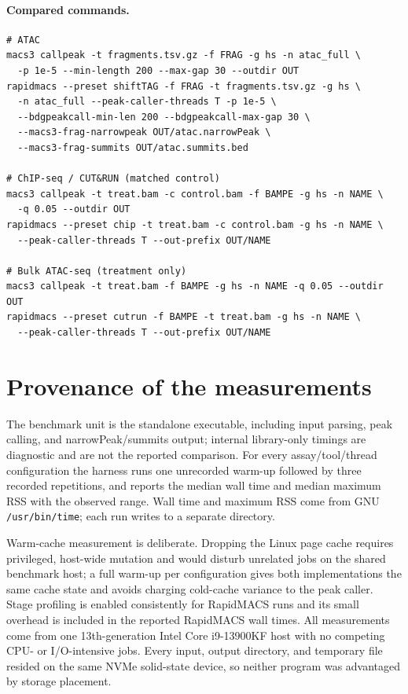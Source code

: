 \documentclass[10pt]{article}
\begin{document}
\paragraph{Compared commands.}
\begin{verbatim}
# ATAC
macs3 callpeak -t fragments.tsv.gz -f FRAG -g hs -n atac_full \
  -p 1e-5 --min-length 200 --max-gap 30 --outdir OUT
rapidmacs --preset shiftTAG -f FRAG -t fragments.tsv.gz -g hs \
  -n atac_full --peak-caller-threads T -p 1e-5 \
  --bdgpeakcall-min-len 200 --bdgpeakcall-max-gap 30 \
  --macs3-frag-narrowpeak OUT/atac.narrowPeak \
  --macs3-frag-summits OUT/atac.summits.bed

# ChIP-seq / CUT&RUN (matched control)
macs3 callpeak -t treat.bam -c control.bam -f BAMPE -g hs -n NAME \
  -q 0.05 --outdir OUT
rapidmacs --preset chip -t treat.bam -c control.bam -g hs -n NAME \
  --peak-caller-threads T --out-prefix OUT/NAME

# Bulk ATAC-seq (treatment only)
macs3 callpeak -t treat.bam -f BAMPE -g hs -n NAME -q 0.05 --outdir OUT
rapidmacs --preset cutrun -f BAMPE -t treat.bam -g hs -n NAME \
  --peak-caller-threads T --out-prefix OUT/NAME
\end{verbatim}

\section{Provenance of the measurements}
The benchmark unit is the standalone executable, including input parsing, peak calling, and narrowPeak/summits output; internal library-only timings are diagnostic and are not the reported comparison. For every assay/tool/thread configuration the harness runs one unrecorded warm-up followed by three recorded repetitions, and reports the median wall time and median maximum RSS with the observed range. Wall time and maximum RSS come from GNU \texttt{/usr/bin/time}; each run writes to a separate directory.

Warm-cache measurement is deliberate. Dropping the Linux page cache requires privileged, host-wide mutation and would disturb unrelated jobs on the shared benchmark host; a full warm-up per configuration gives both implementations the same cache state and avoids charging cold-cache variance to the peak caller. Stage profiling is enabled consistently for RapidMACS runs and its small overhead is included in the reported RapidMACS wall times. All measurements come from one 13th-generation Intel Core i9-13900KF host with no competing CPU- or I/O-intensive jobs. Every input, output directory, and temporary file resided on the same NVMe solid-state device, so neither program was advantaged by storage placement.
\end{document}
